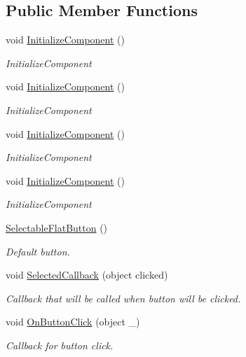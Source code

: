 \subsection*{Public Member Functions}
\begin{DoxyCompactItemize}
\item 
void \mbox{\hyperlink{class_wpf_handler_1_1_u_i_1_1_controls_1_1_selectable_flat_button_ab8dd666c08bc02e2c4677c7a780bb828}{Initialize\+Component}} ()
\begin{DoxyCompactList}\small\item\em Initialize\+Component \end{DoxyCompactList}\item 
void \mbox{\hyperlink{class_wpf_handler_1_1_u_i_1_1_controls_1_1_selectable_flat_button_ab8dd666c08bc02e2c4677c7a780bb828}{Initialize\+Component}} ()
\begin{DoxyCompactList}\small\item\em Initialize\+Component \end{DoxyCompactList}\item 
void \mbox{\hyperlink{class_wpf_handler_1_1_u_i_1_1_controls_1_1_selectable_flat_button_ab8dd666c08bc02e2c4677c7a780bb828}{Initialize\+Component}} ()
\begin{DoxyCompactList}\small\item\em Initialize\+Component \end{DoxyCompactList}\item 
void \mbox{\hyperlink{class_wpf_handler_1_1_u_i_1_1_controls_1_1_selectable_flat_button_ab8dd666c08bc02e2c4677c7a780bb828}{Initialize\+Component}} ()
\begin{DoxyCompactList}\small\item\em Initialize\+Component \end{DoxyCompactList}\item 
\mbox{\hyperlink{class_wpf_handler_1_1_u_i_1_1_controls_1_1_selectable_flat_button_a05bd4f4c7754212984b77499922a275d}{Selectable\+Flat\+Button}} ()
\begin{DoxyCompactList}\small\item\em Default button. \end{DoxyCompactList}\item 
void \mbox{\hyperlink{class_wpf_handler_1_1_u_i_1_1_controls_1_1_selectable_flat_button_a0ce515d3620b53667b3aa377ea4f2f6b}{Selected\+Callback}} (object clicked)
\begin{DoxyCompactList}\small\item\em Callback that will be called when button will be clicked. \end{DoxyCompactList}\item 
void \mbox{\hyperlink{class_wpf_handler_1_1_u_i_1_1_controls_1_1_selectable_flat_button_aa6389115bf881a33ed384871a7ae816a}{On\+Button\+Click}} (object \+\_\+)
\begin{DoxyCompactList}\small\item\em Callback for button click. \end{DoxyCompactList}\end{DoxyCompactItemize}
